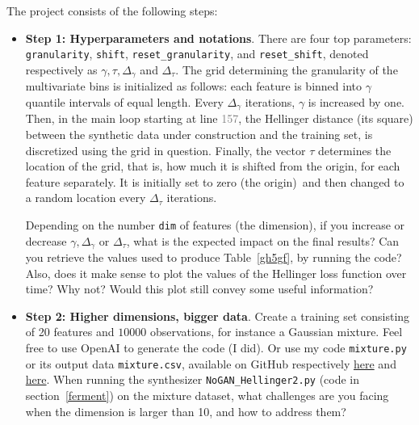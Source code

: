 \documentclass[oneside,10pt]{book}
\begin{document}

\noindent The project consists of the following steps:

\vspace{1ex}

\begin{itemize}
\item[] {\bf Step 1: Hyperparameters and notations}.  There are four top parameters: \texttt{granularity}, \texttt{shift}, \texttt{reset\_granularity},
 and \texttt{reset\_shift}, denoted respectively as 
 $\gamma, \tau, \Delta_\gamma$ and $\Delta_\tau$. The grid determining the granularity of the multivariate bins is initialized as follows:
 each feature is binned into $\gamma$ \textcolor{index}{quantile} intervals of equal length. Every $\Delta_\gamma$ iterations, $\gamma$ is increased by one.  Then, in the main loop starting at line \textcolor{gray}{157}, the Hellinger distance (its square) between the synthetic data under construction and the training set, is discretized using the grid in question. Finally, the vector 
 $\tau$ determines the location of the grid, that is, how much it is shifted from the origin, for each feature separately. It is 
 initially set to zero (the origin)~and then changed to a random location every $\Delta_\tau$ iterations. 

Depending on the number \texttt{dim} of features (the dimension), if you increase or decrease $\gamma, \Delta_\gamma$ or $\Delta_\tau$, what is the expected impact on the final results? Can you retrieve the values used
to produce Table~\ref{gh5gf}, by running the code? Also, does it make sense to plot the values of the Hellinger loss function over time? Why not? Would this plot still convey some 
useful information?

\vspace{1ex}
\item[] {\bf Step 2: Higher dimensions, bigger data}.  Create a training set consisting of 20 features and $\num{10000}$ observations, for instance a 
\textcolor{index}{Gaussian mixture}. Feel free to use \textcolor{index}{OpenAI} to generate the code (I 
did). Or use my code \texttt{mixture.py} or its output data \texttt{mixture.csv}, available on GitHub
 respectively \href{https://github.com/VincentGranville/Main/blob/main/mixture.py}{here}
and \href{https://github.com/VincentGranville/Main/blob/main/mixture.csv}{here}. When running the synthesizer 
\texttt{NoGAN\_Hellinger2.py} (code in section~\ref{ferment}) on 
 the mixture dataset,  what challenges are you facing when the dimension is larger than 10, and how to address them?  


\end{itemize}
\end{document}
